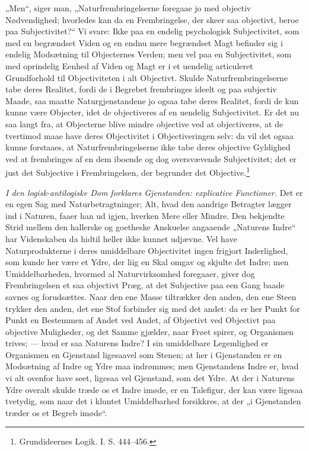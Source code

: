 \documentclass[12pt]{book}
\newcommand{\opage}[1]{\marginnote{\footnotesize\textit{[#1]}}}
\begin{document}
„Men“, siger man, „Naturfrembringelserne foregaae jo
med objectiv Nødvendighed; hvorledes kan da en Frembringelse,
der skeer saa objectivt, beroe paa Subjectivitet?“ Vi
svare: Ikke paa en endelig psychologisk Subjectivitet, som med
en begrændset Viden og en endnu mere begrændset Magt befinder
sig i endelig Modsætning til Objecternes Verden; men
vel paa en Subjectivitet, som med oprindelig Eenhed af
Viden og Magt er i et uendelig articuleret Grundforhold til
Objectiviteten i alt Objectivt. Skulde Naturfrembringelserne
tabe deres Realitet, fordi de i Begrebet frembringes ideelt og
paa subjectiv Maade, saa maatte Naturgjenstandene jo ogsaa
tabe deres Realitet, fordi de kun kunne være Objecter, idet
de objectiveres af en uendelig Subjectivitet. Er det nu saa
langt fra, at Objecterne blive mindre objective ved at objectiveres,
at de tvertimod maae have deres Objectivitet i Objectiveringen
selv: da vil det ogsaa kunne forstaaes, at Naturfrembringelserne
ikke tabe deres objective Gyldighed ved at
frembringes af en dem iboende og dog oversvævende Subjectivitet;
det er just det Subjective i Frembringelsen, der begrunder
det Objective.\footnote{Grundideernes Logik. I. S. 444--456.} %

\emph{I den logisk-antilogiske Dom forklares Gjenstanden:
explicative Functioner.} Det er en egen Sag
med Naturbetragtninger; Alt, hvad den aandrige Betragter
lægger ind i Naturen, faaer han ud igjen, hverken Mere eller
Mindre. Den bekjendte Strid mellem den hallerske og goetheske
Anskuelse angaaende „Naturens Indre“ har Videnskaben da
\opage{140}hidtil heller ikke kunnet udjævne. Vel have Naturprodukterne
i deres umiddelbare Objectivitet ingen frigjort Inderlighed,
som kunde her være et Ydre, der liig en Skal omgav og
skjulte det Indre; men Umiddelbarheden, hvormed al Naturvirksomhed
foregaaer, giver dog Frembringelsen et saa objectivt
Præg, at det Subjective paa een Gang baade savnes og
forudsættes. Naar den ene Masse tiltrækker den anden, den
ene Steen trykker den anden, det ene Stof forbinder sig med
det andet: da er her Punkt for Punkt en Bestemmen af
Andet ved Andet, af Objectivt ved Objectivt paa objective
Muligheder, og det Samme gjælder, naar Frøet spirer, og
Organismen trives; --- hvad er saa Naturens Indre? I sin
umiddelbare Legemlighed er Organismen en Gjenstand ligesaavel
som Stenen; at her i Gjenstanden er en Modsætning af
Indre og Ydre maa indrømmes; men Gjenstandens Indre er,
hvad vi alt ovenfor have seet, ligesaa vel Gjenstand, som det
Ydre. At der i Naturens Ydre overalt skulde træde os et
Indre imøde, er en Talefigur, der kan være ligesaa tvetydig,
som naar det i kluntet Umiddelbarhed forsikkres, at der „i
Gjenstanden træder os et Begreb imøde“.
\end{document}
